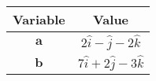 \begin{tabular}{|c|c|}
\hline
\textbf{Variable} & \textbf{Value} \\
\hline
$\mathbf{a}$ & $2\hat{i} - \hat{j} - 2\hat{k}$ \\
\hline
$\mathbf{b}$ & $7\hat{i} + 2\hat{j} - 3\hat{k}$ \\
\hline
\end{tabular}